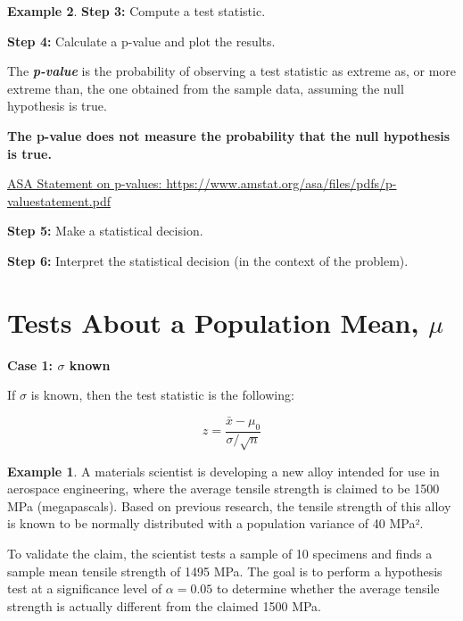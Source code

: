 \documentclass[
  11pt,
  oneside]{book}
\theoremstyle{definition}
\theoremstyle{definition}
\newtheorem{example}{Example}[chapter]
\theoremstyle{definition}
\theoremstyle{definition}
\theoremstyle{remark}
\begin{document}
\begin{example}
\textbf{Step 3:} Compute a test statistic.
\vfill \vfill \vfill \vfill

\newpage

\textbf{Step 4:} Calculate a p-value and plot the results.

The \textbf{\emph{p-value}} is the probability of observing a test statistic as extreme as, or more extreme than, the one obtained from the sample data, assuming the null hypothesis is true.

\vfill

\textbf{The p-value does not measure the probability that the null hypothesis is true.}

\href{https://www.amstat.org/asa/files/pdfs/p-valuestatement.pdf}{ASA Statement on p-values: https://www.amstat.org/asa/files/pdfs/p-valuestatement.pdf}

\textbf{Step 5:} Make a statistical decision.
\vfill

\textbf{Step 6:} Interpret the statistical decision (in the context of the problem).
\vfill \vfill \vfill

\newpage

\section{\texorpdfstring{Tests About a Population Mean, \(\mu\)}{Tests About a Population Mean, \textbackslash mu}}\label{tests-about-a-population-mean-mu}

\textbf{Case 1: \(\sigma\) known}

If \(\sigma\) is known, then the test statistic is the following:

\[z = \frac{\bar{x}-\mu_0}{\sigma/\sqrt{n}}\]

\begin{example}
A materials scientist is developing a new alloy intended for use in aerospace engineering, where the average tensile strength is claimed to be 1500 MPa (megapascals). Based on previous research, the tensile strength of this alloy is known to be normally distributed with a population variance of 40 MPa².

To validate the claim, the scientist tests a sample of 10 specimens and finds a sample mean tensile strength of 1495 MPa. The goal is to perform a hypothesis test at a significance level of \(\alpha = 0.05\) to determine whether the average tensile strength is actually different from the claimed 1500 MPa.
\end{example}

\vfill


\end{example}
\end{document}
